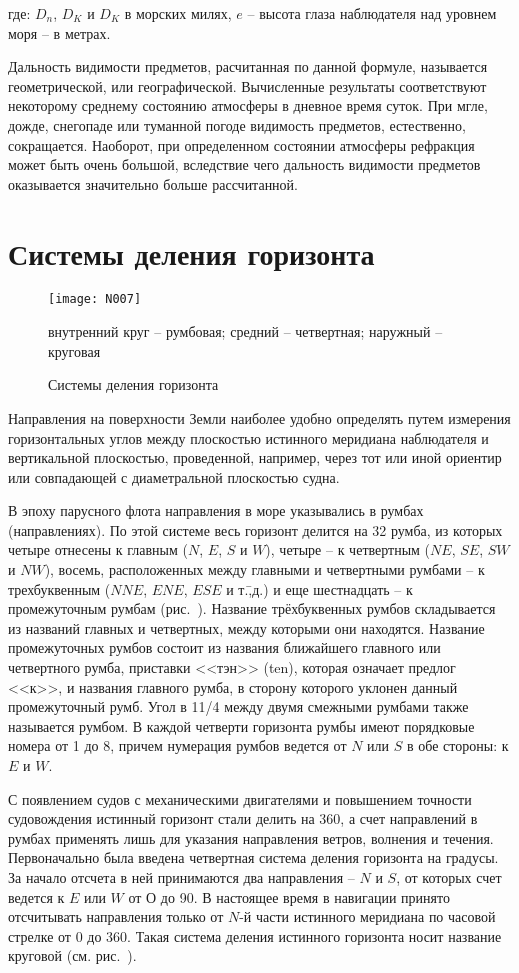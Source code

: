 где: $D_n$, $D_K$ и $D_K$ в морских милях, $e$ \--- высота глаза наблюдателя над уровнем моря \--- в метрах.
 
Дальность видимости предметов, расчитанная по данной формуле, называется геометрической, или географической. Вычисленные результаты соответствуют некоторому среднему состоянию атмосферы в дневное время суток. При мгле, дожде, снегопаде или туманной погоде видимость предметов, естественно, сокращается. Наоборот, при определенном состоянии атмосферы рефракция может быть очень большой, вследствие чего дальность видимости предметов оказывается значительно больше рассчитанной. 

\section{Системы деления горизонта}

\begin{figure}[htb]
  \centering{}
  \texttt{[image: N007]}
  \caption{Системы деления горизонта}
  \label{fig:N7}
  \small
  \centering{}
  внутренний круг \--- румбовая; средний \--- четвертная; наружный \--- круговая
\end{figure}

Направления на поверхности Земли наиболее удобно определять путем измерения горизонтальных углов между плоскостью истинного меридиана наблюдателя и вертикальной плоскостью, проведенной, например, через тот или иной ориентир или совпадающей с диаметральной плоскостью судна. 

В эпоху парусного флота направления в море указывались в румбах (направлениях). По этой системе весь горизонт делится на 32 румба, из которых четыре отнесены к главным ($N$, $E$, $S$ и $W$), четыре \--- к четвертным ($NE$, $SE$, $SW$ и $NW$), восемь, расположенных между главными и четвертными румбами \--- к трехбуквенным ($NNE$, $ENE$, $ESE$ и т.\=,д.) и еще шестнадцать \--- к промежуточным румбам (рис.~). Название трёхбуквенных румбов складывается из названий главных и четвертных, между которыми они находятся. Название промежуточных румбов состоит из названия ближайшего главного или четвертного румба, приставки <<тэн>> (ten), которая означает предлог <<к>>, и названия главного румба, в сторону которого уклонен данный промежуточный румб. Угол в 11/4 между двумя смежными румбами также называется румбом. В каждой четверти горизонта румбы имеют порядковые номера от 1 до 8, причем нумерация румбов ведется от $N$ или $S$ в обе стороны: к $E$ и $W$. 

С появлением судов с механическими двигателями и повышением точности судовождения истинный горизонт стали делить на 360\gr, а счет направлений в румбах применять лишь для указания направления ветров, волнения и течения. Первоначально была введена четвертная система деления горизонта на градусы. За начало отсчета в ней принимаются два направления \--- $N$ и $S$, от которых счет ведется к $E$ или $W$ от О до 90\gr. В настоящее время в навигации принято отсчитывать направления только от $N$-й части истинного меридиана по часовой стрелке от 0 до 360\gr. Такая система деления истинного горизонта носит название круговой (см. рис.~). 

